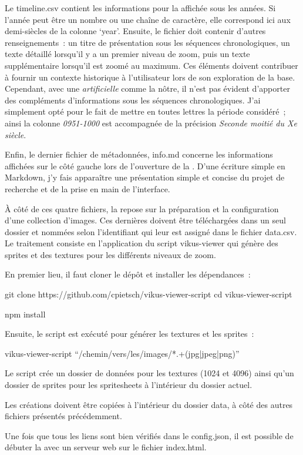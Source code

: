 Le timeline.csv contient les informations pour la  affichée sous les années. Si l’année peut être un nombre ou une chaîne de caractère, elle correspond ici aux demi-siècles de la colonne ‘year’. Ensuite, le fichier doit contenir d’autres renseignements~: un titre de présentation sous les séquences chronologiques, un texte détaillé lorsqu’il y a un premier niveau de zoom, puis un texte supplémentaire lorsqu’il est zoomé au maximum. Ces éléments doivent contribuer à fournir un contexte historique à l’utilisateur lors de son exploration de la base. Cependant, avec une  \textit{artificielle} comme la nôtre, il n’est pas évident d’apporter des compléments d’informations sous les séquences chronologiques. J’ai simplement opté pour le fait de mettre en toutes lettres la période considéré~; ainsi la colonne \textit{0951-1000} est accompagnée de la précision \textit{Seconde moitié du Xe siècle}.\par
Enfin, le dernier fichier de métadonnées, info.md concerne les informations affichées sur le côté gauche lors de l'ouverture de la . D’une écriture simple en Markdown, j’y fais apparaître une présentation simple et concise du projet de recherche et de la prise en main de l’interface.\\\par
À côté de ces quatre fichiers, la  repose sur la préparation et la configuration d’une collection d’images. Ces dernières doivent être téléchargées dans un seul dossier et nommées selon l’identifiant qui leur est assigné dans le fichier data.csv. Le traitement consiste en l’application du script vikus-viewer qui génère des sprites et des textures pour les différents niveaux de zoom.\par
En premier lieu, il faut cloner le dépôt et installer les dépendances~:\par
git clone https://github.com/cpietsch/vikus-viewer-script
cd vikus-viewer-script\par
npm install\\\par
Ensuite, le script est exécuté pour générer les textures et les sprites~:\par
vikus-viewer-script \enquote{/chemin/vers/les/images/*.+(jpg|jpeg|png)}\\\par
Le script crée un dossier de données pour les textures (1024 et 4096) ainsi qu'un dossier de sprites pour les spritesheets à l'intérieur du dossier actuel. \\\par
Les créations doivent être copiées à l’intérieur du dossier data, à côté des autres fichiers présentés précédemment.\par
Une fois que tous les liens sont bien vérifiés dans le config.json, il est possible de débuter la  avec un serveur web sur le fichier index.html.\newpage

